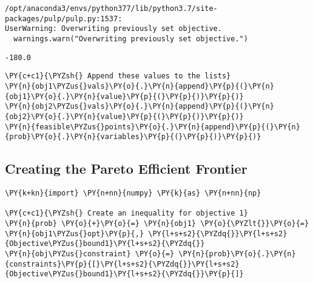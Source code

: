     \begin{Verbatim}[commandchars=\\\{\}]
/opt/anaconda3/envs/python377/lib/python3.7/site-packages/pulp/pulp.py:1537:
UserWarning: Overwriting previously set objective.
  warnings.warn("Overwriting previously set objective.")
    \end{Verbatim}

            \begin{tcolorbox}[breakable, size=fbox, boxrule=.5pt, pad at break*=1mm, opacityfill=0]
\begin{Verbatim}[commandchars=\\\{\}]
-180.0
\end{Verbatim}
\end{tcolorbox}
        
    \begin{tcolorbox}[breakable, size=fbox, boxrule=1pt, pad at break*=1mm,colback=cellbackground, colframe=cellborder]
\begin{Verbatim}[commandchars=\\\{\}]
\PY{c+c1}{\PYZsh{} Append these values to the lists}
\PY{n}{obj1\PYZus{}vals}\PY{o}{.}\PY{n}{append}\PY{p}{(}\PY{n}{obj1}\PY{o}{.}\PY{n}{value}\PY{p}{(}\PY{p}{)}\PY{p}{)}
\PY{n}{obj2\PYZus{}vals}\PY{o}{.}\PY{n}{append}\PY{p}{(}\PY{n}{obj2}\PY{o}{.}\PY{n}{value}\PY{p}{(}\PY{p}{)}\PY{p}{)}
\PY{n}{feasible\PYZus{}points}\PY{o}{.}\PY{n}{append}\PY{p}{(}\PY{n}{prob}\PY{o}{.}\PY{n}{variables}\PY{p}{(}\PY{p}{)}\PY{p}{)}
\end{Verbatim}
\end{tcolorbox}

    \hypertarget{creating-the-pareto-efficient-frontier}{%
\subsection{Creating the Pareto Efficient
Frontier}\label{creating-the-pareto-efficient-frontier}}

    \begin{tcolorbox}[breakable, size=fbox, boxrule=1pt, pad at break*=1mm,colback=cellbackground, colframe=cellborder]
\begin{Verbatim}[commandchars=\\\{\}]
\PY{k+kn}{import} \PY{n+nn}{numpy} \PY{k}{as} \PY{n+nn}{np}

\PY{c+c1}{\PYZsh{} Create an inequality for objective 1}
\PY{n}{prob} \PY{o}{+}\PY{o}{=} \PY{n}{obj1} \PY{o}{\PYZlt{}}\PY{o}{=} \PY{n}{obj1\PYZus{}opt}\PY{p}{,} \PY{l+s+s2}{\PYZdq{}}\PY{l+s+s2}{Objective\PYZus{}bound1}\PY{l+s+s2}{\PYZdq{}}
\PY{n}{obj\PYZus{}constraint} \PY{o}{=} \PY{n}{prob}\PY{o}{.}\PY{n}{constraints}\PY{p}{[}\PY{l+s+s2}{\PYZdq{}}\PY{l+s+s2}{Objective\PYZus{}bound1}\PY{l+s+s2}{\PYZdq{}}\PY{p}{]}
\end{Verbatim}
\end{tcolorbox}

